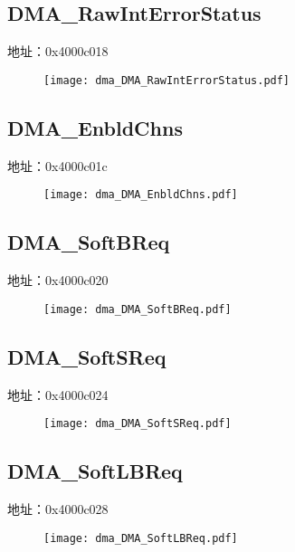 \subsection{DMA\_RawIntErrorStatus}
\label{dma-DMA-RawIntErrorStatus}
地址：0x4000c018
 \begin{figure}[H]
\texttt{[image: dma\_DMA\_RawIntErrorStatus.pdf]}
\end{figure}

\subsection{DMA\_EnbldChns}
\label{dma-DMA-EnbldChns}
地址：0x4000c01c
 \begin{figure}[H]
\texttt{[image: dma\_DMA\_EnbldChns.pdf]}
\end{figure}

\subsection{DMA\_SoftBReq}
\label{dma-DMA-SoftBReq}
地址：0x4000c020
 \begin{figure}[H]
\texttt{[image: dma\_DMA\_SoftBReq.pdf]}
\end{figure}

\subsection{DMA\_SoftSReq}
\label{dma-DMA-SoftSReq}
地址：0x4000c024
 \begin{figure}[H]
\texttt{[image: dma\_DMA\_SoftSReq.pdf]}
\end{figure}

\subsection{DMA\_SoftLBReq}
\label{dma-DMA-SoftLBReq}
地址：0x4000c028
 \begin{figure}[H]
\texttt{[image: dma\_DMA\_SoftLBReq.pdf]}
\end{figure}

